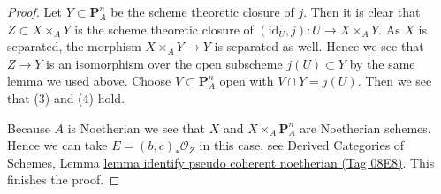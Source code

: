 \documentclass{amsart}
\theoremstyle{plain}
\theoremstyle{definition}
\theoremstyle{remark}
\numberwithin{equation}{subsection}
\begin{document}
\begin{proof}
\medskip\noindent
Let $Y \subset \mathbf{P}^n_A$ be the scheme theoretic
closure of $j$. Then it is clear that $Z \subset X \times_A Y$
is the scheme theoretic closure of
$(\text{id}_U, j) : U \to X \times_A Y$.
As $X$ is separated, the morphism
$X \times_A Y \to Y$ is separated as well.
Hence we see that $Z \to Y$ is an isomorphism over
the open subscheme $j(U) \subset Y$ by the same lemma we used above.
Choose $V \subset \mathbf{P}^n_A$ open with $V \cap Y = j(U)$.
Then we see that (3) and (4) hold.

\medskip\noindent
Because $A$ is Noetherian we see that $X$ and $X \times_A \mathbf{P}^n_A$
are Noetherian schemes. Hence we can take $E = (b, c)_*\mathcal{O}_Z$
in this case, see Derived Categories of Schemes, Lemma
\href{https://stacks.math.columbia.edu/tag/08E8}{lemma identify pseudo coherent noetherian (Tag 08E8)}.
This finishes the proof.
\end{proof}
\end{document}
